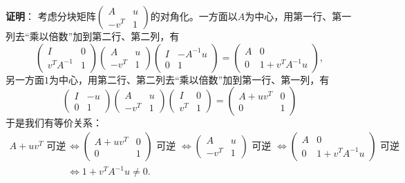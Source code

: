 \ifIncludeAnswer

\newpageorvspace

{\bf 证明}： 考虑分块矩阵$\begin{pmatrix} A & u \\ -v^T & 1 \end{pmatrix}$的对角化。一方面以$A$为中心，用第一行、第一列去``乘以倍数''加到第二行、第二列，有
$$\begin{pmatrix} I & 0 \\ v^TA^{-1} & 1 \end{pmatrix} \begin{pmatrix} A & u \\ -v^T & 1 \end{pmatrix} \begin{pmatrix} I & -A^{-1}u \\ 0 & 1 \end{pmatrix} = \begin{pmatrix} A & 0 \\ 0 & 1 + v^TA^{-1}u \end{pmatrix},$$
另一方面$1$为中心，用第二行、第二列去``乘以倍数''加到第一行、第一列，有
$$\begin{pmatrix} I & -u \\ 0 & 1 \end{pmatrix} \begin{pmatrix} A & u \\ -v^T & 1 \end{pmatrix} \begin{pmatrix} I & 0 \\ v^T & 1 \end{pmatrix} = \begin{pmatrix} A + uv^T & 0 \\ 0 & 1 \end{pmatrix}$$
于是我们有等价关系：
\begin{align*}
A + uv^T \text{ 可逆 } & \Longleftrightarrow \begin{pmatrix} A + uv^T & 0 \\ 0 & 1 \end{pmatrix} \text{ 可逆 } \Longleftrightarrow \begin{pmatrix} A & u \\ -v^T & 1 \end{pmatrix} \text{ 可逆 } \Longleftrightarrow \begin{pmatrix} A & 0 \\ 0 & 1 + v^TA^{-1}u \end{pmatrix} \text{ 可逆 } \\
& \Longleftrightarrow 1 + v^TA^{-1}u \neq 0.
\end{align*}
